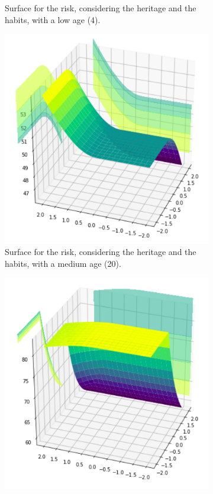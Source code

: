 \begin{figure}[ht]
\begin{subfigure}{.3\textwidth}
  \caption{Surface for the risk, considering the heritage and the habits, with a low age (4).}
  \label{fig:sur4}
\end{subfigure}
\begin{subfigure}{.3\textwidth}
  \centering
  \includegraphics[width=.8\linewidth]{figures/surfaces/habits-heritage20.png}  
  \caption{Surface for the risk, considering the heritage and the habits, with a medium age (20).}
  \label{fig:sur5}
\end{subfigure}
\begin{subfigure}{.3\textwidth}
  \centering
  \includegraphics[width=.8\linewidth]{figures/surfaces/habits-heritage90.png}  

\end{subfigure}
\end{figure}
